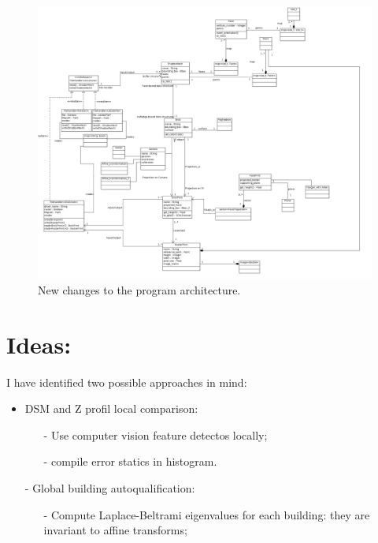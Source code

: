 \documentclass[a4paper, 11pt]{article}
\begin{document}
	\begin{figure}[H]
		\caption{\label{diag::class} New changes to the program architecture.}
		\includegraphics[scale=.27]{images/vectorial/class_diagram.png}
	\end{figure}
	
	\section*{Ideas:}
	I have identified two possible approaches in mind:
	\begin{itemize}
		\item DSM and Z profil local comparison:
		\begin{itemize}
			\item[-] Use computer vision feature detectos locally;
			\item[-] compile error statics in histogram.
		\end{itemize}
		\item[-] Global building autoqualification:
		\begin{itemize}
			\item[-] Compute Laplace-Beltrami eigenvalues for each building: they are invariant to affine transforms;
		\end{itemize}
	\end{itemize}
	
\end{document}

